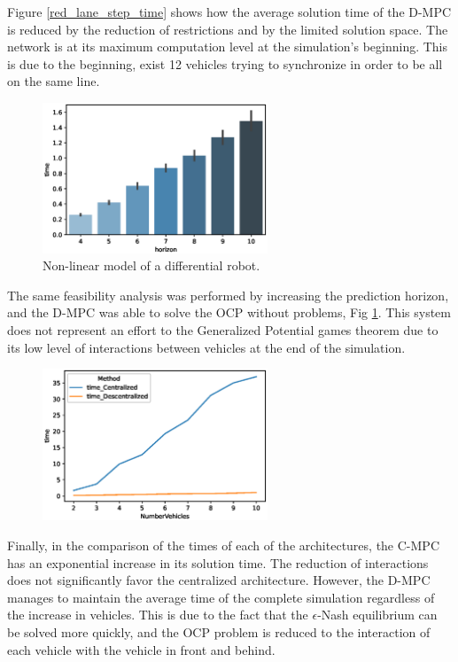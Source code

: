 Figure \ref{red_lane_step_time} shows how the average solution time of the D-MPC is reduced by the reduction of restrictions and by the limited solution space. The network is at its maximum computation level at the simulation's beginning. This is due to the beginning, exist 12 vehicles trying to synchronize in order to be all on the same line.


\begin{figure}[H]
\centering
    \includegraphics[width=0.6\textwidth]{Kap6/red_lane/red_lane_horizon_time.eps}
    \caption{Non-linear model of a differential robot.}
    \label{red_lane_horizon}
\end{figure}

The same feasibility analysis was performed by increasing the prediction horizon, and the D-MPC was able to solve the OCP without problems, Fig \ref{red_lane_horizon}. This system does not represent an effort to the Generalized Potential games theorem due to its low level of interactions between vehicles at the end of the simulation.




\begin{figure}[H]
\centering
    \includegraphics[width=0.6\textwidth]{Kap6/red_lane/red_lane_n_vehicles.eps}

\end{figure}

Finally, in the comparison of the times of each of the architectures, the C-MPC has an exponential increase in its solution time. The reduction of interactions does not significantly favor the centralized architecture. However, the D-MPC manages to maintain the average time of the complete simulation regardless of the increase in vehicles. This is due to the fact that the $\epsilon$-Nash equilibrium can be solved more quickly, and the OCP problem is reduced to the interaction of each vehicle with the vehicle in front and behind.

